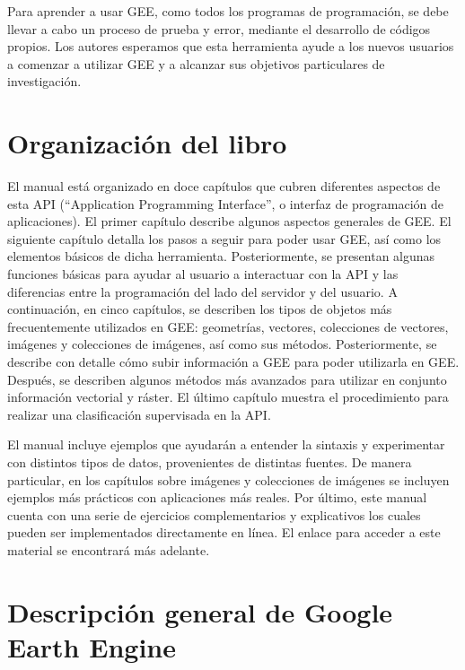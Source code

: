 \documentclass[
  12pt,
  letterpaper,
  twoside]{book}
\begin{document}
Para aprender a usar GEE, como todos los programas de programación, se debe llevar a cabo un proceso de prueba y error, mediante el desarrollo de códigos propios. Los autores esperamos que esta herramienta ayude a los nuevos usuarios a comenzar a utilizar GEE y a alcanzar sus objetivos particulares de investigación.

\hypertarget{organizaciuxf3n-del-libro}{%
\section{Organización del libro}\label{organizaciuxf3n-del-libro}}

El manual está organizado en doce capítulos que cubren diferentes aspectos de esta API (``Application Programming Interface'', o interfaz de programación de aplicaciones). El primer capítulo describe algunos aspectos generales de GEE. El siguiente capítulo detalla los pasos a seguir para poder usar GEE, así como los elementos básicos de dicha herramienta. Posteriormente, se presentan algunas funciones básicas para ayudar al usuario a interactuar con la API y las diferencias entre la programación del lado del servidor y del usuario. A continuación, en cinco capítulos, se describen los tipos de objetos más frecuentemente utilizados en GEE: geometrías, vectores, colecciones de vectores, imágenes y colecciones de imágenes, así como sus métodos. Posteriormente, se describe con detalle cómo subir información a GEE para poder utilizarla en GEE. Después, se describen algunos métodos más avanzados para utilizar en conjunto información vectorial y ráster. El último capítulo muestra el procedimiento para realizar una clasificación supervisada en la API.

El manual incluye ejemplos que ayudarán a entender la sintaxis y experimentar con distintos tipos de datos, provenientes de distintas fuentes. De manera particular, en los capítulos sobre imágenes y colecciones de imágenes se incluyen ejemplos más prácticos con aplicaciones más reales. Por último, este manual cuenta con una serie de ejercicios complementarios y explicativos los cuales pueden ser implementados directamente en línea. El enlace para acceder a este material se encontrará más adelante.

\hypertarget{descripciuxf3n-general-de-google-earth-engine}{%
\section{Descripción general de Google Earth Engine}\label{descripciuxf3n-general-de-google-earth-engine}}
\end{document}
